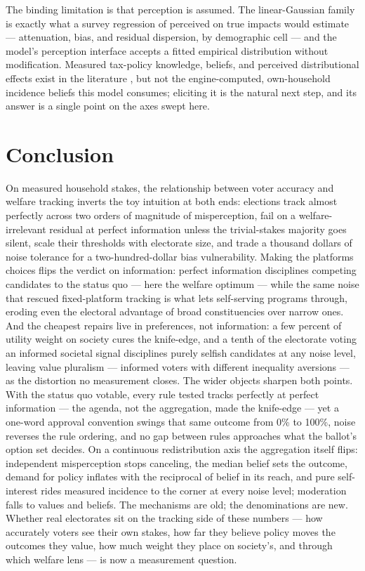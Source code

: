 \documentclass[11pt]{article}
\begin{document}
The binding limitation is that perception is assumed. The linear-Gaussian
family is exactly what a survey regression of perceived on true impacts
would estimate --- attenuation, bias, and residual dispersion, by
demographic cell --- and the model's perception interface accepts a fitted
empirical distribution without modification. Measured tax-policy knowledge, beliefs, and perceived distributional
effects exist in the literature \citep{bartels2005, stantcheva2021}, but
not the engine-computed, own-household incidence beliefs this model
consumes; eliciting it is the natural next
step, and its answer is a single point on the axes swept here.

\section{Conclusion}

On measured household stakes, the relationship between voter accuracy and
welfare tracking inverts the toy intuition at both ends: elections track
almost perfectly across two orders of magnitude of misperception, fail on
a welfare-irrelevant residual at perfect information unless the
trivial-stakes majority goes silent, scale their thresholds with
electorate size, and trade a thousand dollars of noise tolerance for a
two-hundred-dollar bias vulnerability. Making the platforms choices
flips the verdict on information: perfect information disciplines
competing candidates to the status quo --- here the welfare optimum ---
while the same noise that rescued fixed-platform tracking is what lets
self-serving programs through, eroding even the electoral advantage of
broad constituencies over narrow ones. And the cheapest repairs live in
preferences, not information: a few percent of utility weight on society
cures the knife-edge, and a tenth of the electorate voting an informed
societal signal disciplines purely selfish candidates at any noise
level, leaving value pluralism --- informed voters with different
inequality aversions --- as the distortion no measurement closes.
The wider objects sharpen both points. With the status quo votable,
every rule tested tracks perfectly at perfect information --- the
agenda, not the aggregation, made the knife-edge --- yet a one-word
approval convention swings that same outcome from 0\% to 100\%, noise
reverses the rule ordering, and no gap between rules approaches what
the ballot's option set decides. On a continuous redistribution axis
the aggregation itself flips: independent misperception stops
canceling, the median belief sets the outcome, demand for policy
inflates with the reciprocal of belief in its reach, and pure
self-interest rides measured incidence to the corner at every noise
level; moderation falls to values and beliefs. The mechanisms are old;
the denominations are new. Whether real electorates sit on the
tracking side of these numbers --- how accurately voters see their own
stakes, how far they believe policy moves the outcomes they value, how
much weight they place on society's, and through which welfare lens ---
is now a measurement question.
\end{document}
